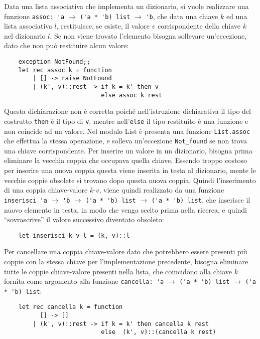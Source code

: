 \documentclass{article}
\numberwithin{equation}{subsection}
\begin{document}
Data una lista associativa che implementa un dizionario, si vuole realizzare una funzione \verb|assoc: 'a| $\rightarrow$ \verb|('a * 'b) list| $\rightarrow$ \verb|'b|, che data una chiave $k$ ed una lista associativa $l$, restituisce, se esiste, il valore $v$ corrispondente della chiave $k$ nel dizionario $l$. Se non viene trovato l'elemento bisogna sollevare un'eccezione, dato che non può restituire alcun valore:
\begin{verbatim}
    exception NotFound;;
    let rec assoc k = function
        | [] -> raise NotFound
        | (k', v)::rest -> if k = k' then v
                           else assoc k rest
\end{verbatim}
Questa dichiarazione non è corretta poiché nell'istruzione dichiarativa il tipo del costrutto \verb|then| è il tipo di \verb|v|, mentre nell'\verb|else| il tipo restituito è una funzione e non coincide ad un valore. 
Nel modulo List è presenta una funzione \verb|List.assoc| che effettua la stessa operazione, e solleva un'eccezione \verb|Not_found| se non trova una chiave corrispondente. 
Per inserire un valore in un dizionario, bisogna prima eliminare la vecchia coppia che occupava quella chiave. Essendo troppo costoso per inserire una nuova coppia questa viene inserita in testa al dizionario, mente le vecchie coppie obsolete si trovano dopo questa nuova coppia. Quindi l'inserimento di una coppia chiave-valore $k$-$v$, viene quindi realizzato da una funzione \verb|inserisci 'a| $\rightarrow$ \verb|'b| $\rightarrow$ \verb|('a * 'b) list| $\rightarrow$ \verb|('a * 'b) list|,
che inserisce il nuovo elemento in testa, in modo che venga scelto prima nella ricerca, e quindi ``sovrascrive'' il valore successivo diventato obsoleto:
\begin{verbatim}
    let inserisci k v l = (k, v)::l    
\end{verbatim}
Per cancellare una coppia chiave-valore dato che potrebbero essere presenti più coppie con la stessa chiave per l'implementazione precedente, bisogna eliminare tutte le coppie chiave-valore presenti nella lista, che coincidono alla chiave $k$ fornita come argomento alla funzione \verb|cancella: 'a| $\rightarrow$ \verb|('a * 'b) list| $\rightarrow$ \verb|('a * 'b) list|:
\begin{verbatim}
    let rec cancella k = function
          [] -> []
        | (k', v)::rest -> if k = k' then cancella k rest
                           else  (k', v)::(cancella k rest)
\end{verbatim}
\end{document}
